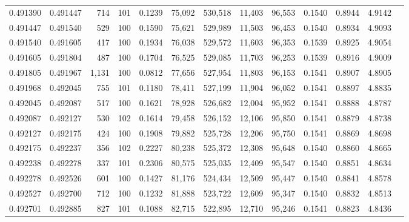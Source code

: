 \begin{tabular}{rrrrrrrrrrrrr}
0.491390 & 0.491447 &   714 & 101 &                                     0.1239 &  75,092 & 530,518 &  11,403 &  96,553 & 0.1540 & 0.8944 & 4.9142 \\
0.491447 & 0.491540 &   529 & 100 &                                     0.1590 &  75,621 & 529,989 &  11,503 &  96,453 & 0.1540 & 0.8934 & 4.9093 \\
0.491540 & 0.491605 &   417 & 100 &                                     0.1934 &  76,038 & 529,572 &  11,603 &  96,353 & 0.1539 & 0.8925 & 4.9054 \\
0.491605 & 0.491804 &   487 & 100 &                                     0.1704 &  76,525 & 529,085 &  11,703 &  96,253 & 0.1539 & 0.8916 & 4.9009 \\
0.491805 & 0.491967 & 1,131 & 100 &                                     0.0812 &  77,656 & 527,954 &  11,803 &  96,153 & 0.1541 & 0.8907 & 4.8905 \\
0.491968 & 0.492045 &   755 & 101 &                                     0.1180 &  78,411 & 527,199 &  11,904 &  96,052 & 0.1541 & 0.8897 & 4.8835 \\
0.492045 & 0.492087 &   517 & 100 &                                     0.1621 &  78,928 & 526,682 &  12,004 &  95,952 & 0.1541 & 0.8888 & 4.8787 \\
0.492087 & 0.492127 &   530 & 102 &                                     0.1614 &  79,458 & 526,152 &  12,106 &  95,850 & 0.1541 & 0.8879 & 4.8738 \\
0.492127 & 0.492175 &   424 & 100 &                                     0.1908 &  79,882 & 525,728 &  12,206 &  95,750 & 0.1541 & 0.8869 & 4.8698 \\
0.492175 & 0.492237 &   356 & 102 &                                     0.2227 &  80,238 & 525,372 &  12,308 &  95,648 & 0.1540 & 0.8860 & 4.8665 \\
0.492238 & 0.492278 &   337 & 101 &                                     0.2306 &  80,575 & 525,035 &  12,409 &  95,547 & 0.1540 & 0.8851 & 4.8634 \\
0.492278 & 0.492526 &   601 & 100 &                                     0.1427 &  81,176 & 524,434 &  12,509 &  95,447 & 0.1540 & 0.8841 & 4.8578 \\
0.492527 & 0.492700 &   712 & 100 &                                     0.1232 &  81,888 & 523,722 &  12,609 &  95,347 & 0.1540 & 0.8832 & 4.8513 \\
0.492701 & 0.492885 &   827 & 101 &                                     0.1088 &  82,715 & 522,895 &  12,710 &  95,246 & 0.1541 & 0.8823 & 4.8436 \\

\end{tabular}
